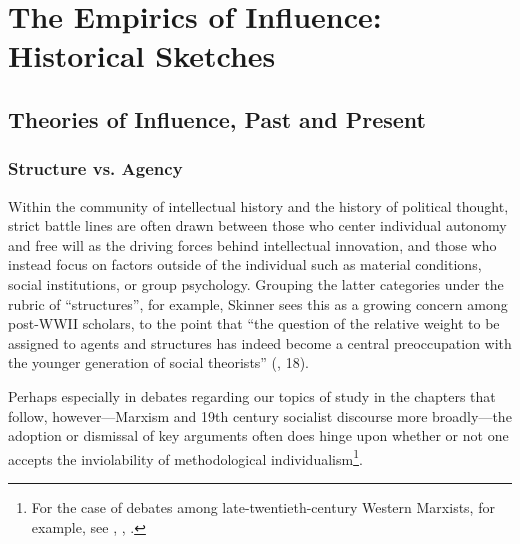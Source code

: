 \documentclass[11pt]{article}
\begin{document}
\section{The Empirics of Influence: Historical Sketches}\label{sec:empirics-of-influence}

\subsection{Theories of Influence, Past and Present}\label{sec:theories-of-influence}

\subsubsection{Structure vs. Agency}\label{sec:structure-agency}

Within the community of intellectual history and the history of political thought, strict battle lines are often drawn between those who center individual autonomy and free will as the driving forces behind intellectual innovation, and those who instead focus on factors outside of the individual such as material conditions, social institutions, or
group psychology. Grouping the latter categories under the rubric of ``structures'', for example, Skinner sees this as a growing concern among post-WWII scholars, to the point that ``the question of the relative weight to be assigned to agents and structures has indeed become a central preoccupation with the younger generation of social theorists'' (\cite{skinner_return_1990}, 18).

Perhaps especially in debates regarding our topics of study in the chapters that follow, however---Marxism and 19th century socialist discourse more broadly---the adoption or dismissal of key arguments often does hinge upon whether or not one accepts the inviolability of methodological individualism\footnote{For the case of debates among late-twentieth-century Western Marxists, for example, see \cite{elster_case_1982}, \cite{althusser_marx_1968}, \cite{cohen_karl_1978}.}.

\end{document}

